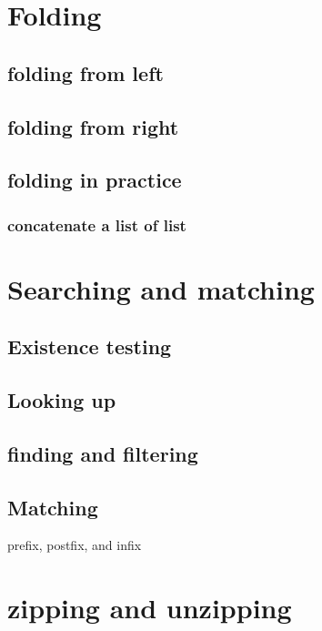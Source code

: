 \documentclass{article}
\begin{document}
\section{Folding}

\subsection{folding from left}

\subsection{folding from right}

\subsection{folding in practice}

\subsubsection{concatenate a list of list}

\section{Searching and matching}

\subsection{Existence testing}

\subsection{Looking up}

\subsection{finding and filtering}



\subsection{Matching}

prefix, postfix, and infix

\section{zipping and unzipping}
\end{document}
